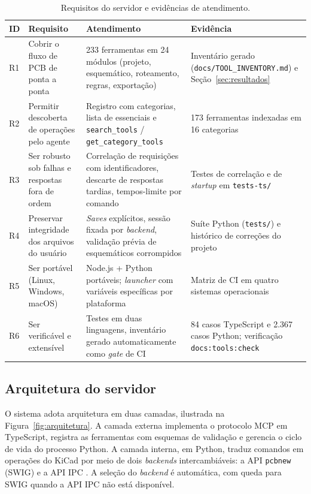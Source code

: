 \begin{table}[htbp]
\centering
\small
\caption{Requisitos do servidor e evidências de atendimento.}
\label{tab:requisitos}
\begin{tabular}{@{}p{0.8cm}p{4.0cm}p{5.4cm}p{4.2cm}@{}}
\toprule
\textbf{ID} & \textbf{Requisito} & \textbf{Atendimento} & \textbf{Evidência} \\
\midrule
R1 & Cobrir o fluxo de PCB de ponta a ponta & 233 ferramentas em 24 módulos (projeto, esquemático, roteamento, regras, exportação) & Inventário gerado (\texttt{docs/TOOL\_INVENTORY.md}) e Seção~\ref{sec:resultados} \\
R2 & Permitir descoberta de operações pelo agente & Registro com categorias, lista de essenciais e \texttt{search\_tools} / \texttt{get\_category\_tools} & 173 ferramentas indexadas em 16 categorias \\
R3 & Ser robusto sob falhas e respostas fora de ordem & Correlação de requisições com identificadores, descarte de respostas tardias, tempos-limite por comando & Testes de correlação e de \emph{startup} em \texttt{tests-ts/} \\
R4 & Preservar integridade dos arquivos do usuário & \emph{Saves} explícitos, sessão fixada por \emph{backend}, validação prévia de esquemáticos corrompidos & Suíte Python (\texttt{tests/}) e histórico de correções do projeto \\
R5 & Ser portável (Linux, Windows, macOS) & Node.js + Python portáveis; \emph{launcher} com variáveis específicas por plataforma & Matriz de CI em quatro sistemas operacionais \\
R6 & Ser verificável e extensível & Testes em duas linguagens, inventário gerado automaticamente como \emph{gate} de CI & 84 casos TypeScript e 2.367 casos Python; verificação \texttt{docs:tools:check} \\
\bottomrule
\end{tabular}
\end{table}

\subsection{Arquitetura do servidor}\label{subsec:arquitetura}

O sistema adota arquitetura em duas camadas, ilustrada na
Figura~\ref{fig:arquitetura}. A camada externa implementa o protocolo MCP em
TypeScript, registra as ferramentas com esquemas de validação e gerencia o
ciclo de vida do processo Python. A camada interna, em Python, traduz comandos
em operações do KiCad por meio de dois \emph{backends} intercambiáveis:
a API \texttt{pcbnew} (SWIG) e a API IPC \citep{kicadcli,kicaddev,swig}. A
seleção do \emph{backend} é automática, com queda para SWIG quando a API IPC
não está disponível.

